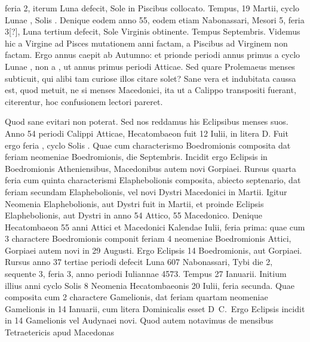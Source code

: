 feria 2, iterum Luna defecit, Sole in Piscibus collocato.
Tempus, 19
Martii, cyclo Lunae , Solis .
Denique eodem anno 55, eodem
etiam Nabonassari, Mesori 5, feria
3[?], Luna tertium defecit, Sole 
Virginis obtinente.
Tempus 
Septembris.
Videmus hic a Virgine
ad Pisces mutationem anni factam,
a Piscibus ad Virginem non
factam.
Ergo annus caepit ab Autumno:
et prionde periodi annus
primus a cyclo Lunae , non a
, ut annus primus periodi Atticae.
Sed quare Prolemaeus menses
subticuit, qui alibi tam curiose illos citare solet?
Sane vera et indubitata
caussa est, quod metuit, ne si menses Macedonici, ita ut a Calippo
transpositi fuerant, citerentur, hoc confusionem lectori pareret.

Quod
sane evitari non poterat.
Sed nos reddamus his Eclipsibus menses suos.
Anno 54 periodi Calippi Atticae, Hecatombaeon fuit 12 Iulii, in litera
D.
Fuit ergo feria , cyclo Solis .
Quae cum characterismo Boedromionis
composita dat feriam  neomeniae Boedromionis,
 die  Septembris.
Incidit ergo Eclipsis in  Boedromionis Atheniensibus,
Macedonibus autem novi Gorpiaei.
Rursus quarta feria cum quinta characterismi
Elaphebolionis composita, abiecto septenario, dat feriam
secundam Elaphebolionis, vel novi Dystri Macedonici in  Martii.
Igitur
Neomenia Elaphebolionis, aut Dystri fuit in  Martii, et proinde
Eclipsis  Elaphebolionis, aut Dystri in anno 54 Attico, 55
Macedonico.
Denique Hecatombaeon 55 anni Attici et Macedonici Kalendae
Iulii, feria prima: quae cum 3 charactere Boedromionis componit
feriam 4 neomeniae Boedromionis Attici, Gorpiaei autem novi in
29 Augusti.
Ergo Eclipsis 14 Boedromionis, aut Gorpiaei.
Rursus anno
37 tertiae periodi defecit Luna 607 Nabonassari, Tybi die 2, sequente
3, feria 3, anno periodi Iuliannae 4573.
Tempus 27 Ianuarii.
Initium
illius anni cyclo Solis 8 Neomenia Hecatombaeonis 20 Iulii, feria
secunda.
Quae composita cum 2 charactere Gamelionis, dat feriam quartam
neomeniae Gamelionis in 14 Ianuarii, cum litera Dominicalis esset
D~C.\ 
Ergo Eclipsis incidit in 14 Gamelionis vel Audynaei novi.
\lnr{24}Quod autem notavimus de mensibus Tetraetericis apud Macedonas
